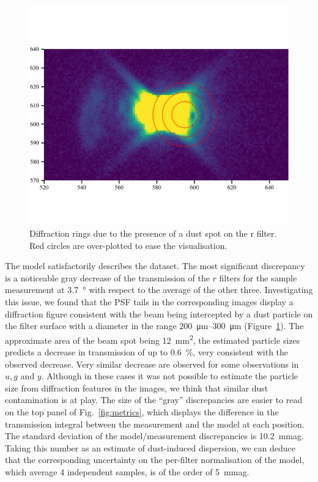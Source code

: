 \begin{figure}
  \centering
  \includegraphics[width=1\linewidth]{fig/diffraction_dust.png}
  \caption{Diffraction rings due to the presence of a dust spot on the r filter. Red circles are over-plotted to ease the visualisation.}
  \label{fig:dust}
\end{figure}

The model satisfactorily describes the dataset. The most significant
discrepancy is a noticeable gray decrease of the transmission of the
$r$ filters for the sample measurement at \SI{3.7}{\degree} with
respect to the average of the other three. Investigating this issue,
we found that the PSF tails in the corresponding images display a
diffraction figure consistent with the beam being intercepted by a
dust particle on the filter surface with a diameter in the range
\SIrange{200}{300}{\micro\meter} (Figure~\ref{fig:dust}). The approximate area of the beam
spot being \SI{12}{mm\squared}, the estimated particle sizes predicts
a decrease in transmission of up to \SI{0.6}{\percent}, very
consistent with the observed decrease. Very similar decrease are
observed for some observations in $u,g$ and $y$. Although in these
cases it was not possible to estimate the particle size from
diffraction features in the images, we think that similar dust
contamination is at play. The size of the ``gray'' discrepancies are
easier to read on the top panel of Fig.~\ref{fig:metrics}, which
displays the difference in the transmission integral between the
measurement and the model at each position. The standard deviation of
the model/measurement discrepancies is \SI{10.2}{mmag}. Taking this
number as an estimate of dust-induced dispersion, we can deduce that
the corresponding uncertainty on the per-filter normalisation of the
model, which average 4 independent samples, is of the order of
\SI{5}{mmag}.

